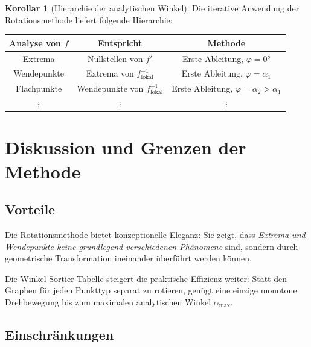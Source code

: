 ﻿\documentclass[12pt, a4paper]{article}
\theoremstyle{definition}
\newtheorem{korollar}{Korollar}[section]
\begin{document}
	\begin{korollar}[Hierarchie der analytischen Winkel]
		Die iterative Anwendung der Rotationsmethode liefert folgende Hierarchie:
		
		\begin{center}
			\begin{tabular}{ccc}
				\toprule
				\textbf{Analyse von $f$} & \textbf{Entspricht} & \textbf{Methode} \\
				\midrule
				Extrema & Nullstellen von $f'$ & Erste Ableitung, $\varphi=0 °$ \\
				Wendepunkte & Extrema von $f^{-1}_\mathrm{lokal}$ & Erste Ableitung, $\varphi = \alpha_1$ \\
				Flachpunkte & Wendepunkte von $f^{-1}_\mathrm{lokal}$ & Erste Ableitung, $\varphi = \alpha_2 > \alpha_1$ \\
				$\vdots$ & $\vdots$ & $\vdots$ \\
				\bottomrule
			\end{tabular}
		\end{center}
	\end{korollar}
	
	\section{Diskussion und Grenzen der Methode}
	
	\subsection{Vorteile}
	
	Die Rotationsmethode bietet konzeptionelle Eleganz: Sie zeigt, dass
	\emph{Extrema und Wendepunkte keine grundlegend verschiedenen Phänomene}
	sind, sondern durch geometrische Transformation ineinander überführt werden
	können.
	
	Die Winkel-Sortier-Tabelle steigert die praktische Effizienz weiter: Statt
	den Graphen für jeden Punkttyp separat zu rotieren, genügt eine einzige
	monotone Drehbewegung bis zum maximalen analytischen Winkel $\alpha_{\max}$.
	
	\subsection{Einschränkungen}
	
\end{document}
